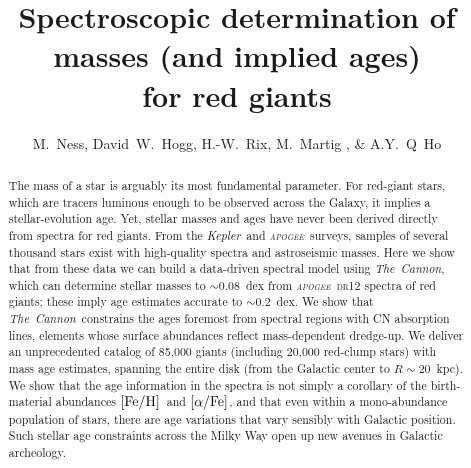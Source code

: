\documentclass[12pt, preprint]{aastex}
\newcommand{\project}[1]{\textsl{#1}}
\newcommand{\tc}{\project{The~Cannon}}
\newcommand{\apogee}{\project{\textsc{apogee}}}
\newcommand{\kepler}{\project{Kepler}}
\newcommand{\feh}{\mbox{$\rm [Fe/H]$}}
\newcommand{\alphafe}{\mbox{$\rm [\alpha/Fe]$}}
\begin{document}

\title{Spectroscopic determination of masses (and implied ages) \\for red giants}
\author{M.~Ness,
        David~W.~Hogg,
        H.-W.~Rix,
        M.~Martig , \&
        A.Y.~Q~Ho }

\begin{abstract}%
The mass of a star is arguably its most fundamental parameter.
For red-giant stars, which are tracers luminous enough to be observed
across the Galaxy, it implies a stellar-evolution age.
Yet, stellar masses and ages have never been derived directly from
spectra for red giants.
From the \kepler\ and \apogee\ surveys, samples of several thousand
stars exist with high-quality spectra and astroseismic masses.
Here we show that from these data we can build a data-driven spectral
model using \tc, which can determine stellar masses to $\sim 0.08$~dex
from \apogee\ \textsc{dr12} spectra of red giants; these imply age
estimates accurate to $\sim 0.2$~dex.
We show that \tc\ constrains the ages foremost from spectral regions
with CN absorption lines, elements whose surface abundances reflect
mass-dependent dredge-up.
We deliver an unprecedented catalog of 85,000 giants (including 20,000
red-clump stars) with mass age estimates, spanning the entire disk
(from the Galactic center to $R\sim 20$~kpc).
We show that the age information in the spectra is not simply a
corollary of the birth-material abundances \feh\ and \alphafe, and
that even within a mono-abundance population of stars, there are age
variations that vary sensibly with Galactic position.
Such stellar age constraints across the Milky Way open up new avenues
in Galactic archeology.
\end{abstract}
\end{document}
